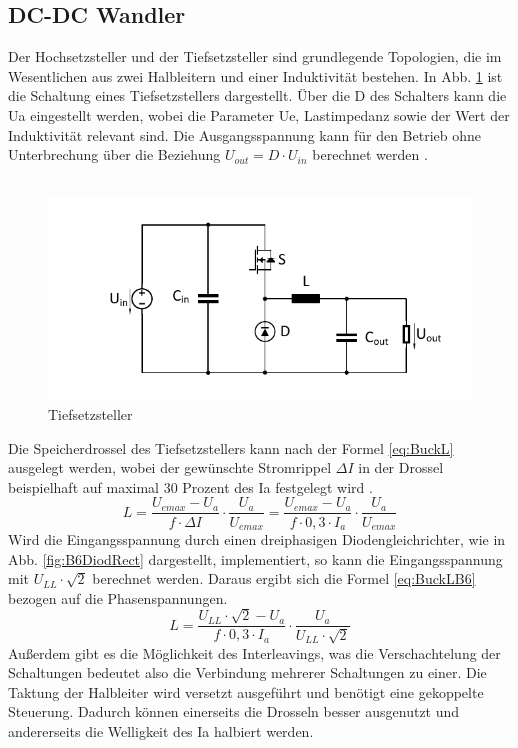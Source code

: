 		\subsection{DC-DC Wandler} \label{sec:Buck}
		Der Hochsetzsteller und der Tiefsetzsteller sind grundlegende Topologien, die im Wesentlichen aus zwei Halbleitern und einer Induktivität bestehen. In Abb. \ref{fig:buck} ist die Schaltung eines Tiefsetzstellers dargestellt. Über die \gls{D} des Schalters kann die \gls{Ua} eingestellt werden, wobei die Parameter \gls{Ue}, Lastimpedanz sowie der Wert der Induktivität relevant sind. Die Ausgangsspannung kann für den Betrieb ohne Unterbrechung über die Beziehung $U_{out}=D\cdot U_{in} $ berechnet werden \cite{schmidtwalter}.\\ \\
		\begin{figure}
			\centering
			\includegraphics[width=0.9\linewidth]{content/Grafiken/Buck}
			\caption[Tiefsetzsteller]{Tiefsetzsteller}
			\label{fig:buck}
		\end{figure}
		Die Speicherdrossel des Tiefsetzstellers kann nach der Formel \ref{eq:BuckL} ausgelegt werden, wobei der gewünschte Stromrippel $\Delta I $ in der Drossel beispielhaft auf maximal 30 Prozent des \gls{Ia} festgelegt wird \cite{schmidtwalter}.
		\begin{equation}
			\label{eq:BuckL}
			L=\dfrac{U_{emax}-U_{a}}{f\cdot \Delta I}\cdot \dfrac{U_{a}}{U_{emax}} = \dfrac{U_{emax}-U_{a}}{f\cdot 0,3 \cdot I_{a}}\cdot \dfrac{U_{a}}{U_{emax}}
		\end{equation}
		Wird die Eingangsspannung durch einen dreiphasigen Diodengleichrichter, wie in Abb. \ref{fig:B6DiodRect} dargestellt,  implementiert, so kann die Eingangsspannung mit $U_{LL} \cdot \sqrt{2}$ berechnet werden. Daraus ergibt sich die Formel \ref{eq:BuckLB6} bezogen auf die Phasenspannungen. \\
		\begin{equation}
			\label{eq:BuckLB6}
			L=\dfrac{U_{LL} \cdot \sqrt{2}-U_{a}}{f\cdot 0,3 \cdot I_{a}}\cdot \dfrac{U_{a}}{U_{LL} \cdot \sqrt{2}}
		\end{equation}
		Außerdem gibt es die Möglichkeit des Interleavings, was die Verschachtelung der Schaltungen bedeutet also die Verbindung mehrerer Schaltungen zu einer. Die Taktung der Halbleiter wird versetzt ausgeführt und benötigt eine gekoppelte Steuerung. Dadurch können einerseits die Drosseln besser ausgenutzt und andererseits die Welligkeit des \gls{Ia} halbiert werden. 
		
